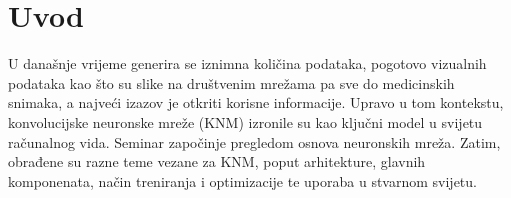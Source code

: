 
\chapter{Uvod}\label{ch:uvod}
U današnje vrijeme generira se iznimna količina podataka, pogotovo vizualnih podataka kao što su slike na društvenim mrežama pa sve do
medicinskih snimaka, a najveći izazov je otkriti korisne informacije.
Upravo u tom kontekstu, konvolucijske neuronske mreže (KNM) izronile su kao ključni model u svijetu računalnog vida.
Seminar započinje pregledom osnova neuronskih mreža.
Zatim, obrađene su razne teme vezane za KNM, poput arhitekture, glavnih komponenata, način treniranja i optimizacije te uporaba u stvarnom svijetu.